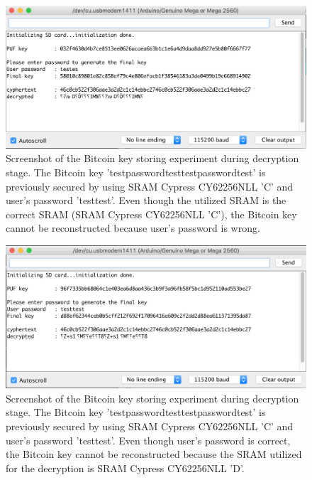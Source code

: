 \begin{figure}[tph!]
    \centerline{\includegraphics[width={\textwidth}]{images/C_decrypt_wrong_password}}
    \caption{Screenshot of the Bitcoin key storing experiment during decryption stage. The Bitcoin key 'testpasswordtesttestpasswordtest' is previously secured by using SRAM Cypress CY62256NLL 'C' and user's password 'testtest'.
    Even though the utilized SRAM is the correct SRAM (SRAM Cypress CY62256NLL 'C'), the Bitcoin key cannot be reconstructed because user's password is wrong.}
    \label{fig:C_decrypt_wrong_password}
\end{figure}

\begin{figure}[tph!]
    \centerline{\includegraphics[width={\textwidth}]{images/C_decrypt_wrong_SRAM}}
    \caption{Screenshot of the Bitcoin key storing experiment during decryption stage. The Bitcoin key 'testpasswordtesttestpasswordtest' is previously secured by using SRAM Cypress CY62256NLL 'C' and user's password 'testtest'.
    Even though user's password is correct, the Bitcoin key cannot be reconstructed because the SRAM utilized for the decryption is SRAM Cypress CY62256NLL 'D'.}
    \label{fig:C_decrypt_wrong_SRAM}
\end{figure}

